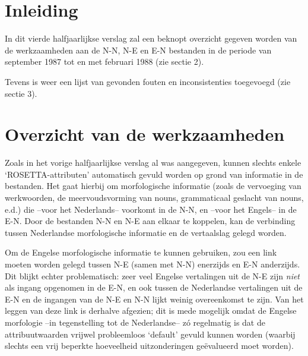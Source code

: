 
   \RosSupersedes{-}
   \MakeRosTitle
%
%

\section{Inleiding}

In dit vierde halfjaarlijkse verslag zal een beknopt 
overzicht gegeven worden van de 
werkzaamheden aan de N-N, N-E en E-N bestanden in de periode van september 1987
tot en met februari 1988 (zie sectie 2).

Tevens is weer een lijst van gevonden fouten en inconsistenties toegevoegd
(zie sectie 3).

\section{Overzicht van de werkzaamheden}

Zoals in het vorige halfjaarlijkse verslag al was aangegeven, kunnen slechts 
enkele `ROSETTA-attributen' automatisch gevuld worden op grond van informatie 
in de bestanden. Het gaat hierbij om morfologische informatie (zoals de 
vervoeging van werkwoorden, de meervoudsvorming van nouns, grammaticaal 
geslacht van nouns, e.d.) die --voor het Nederlands-- voorkomt in de N-N, en 
--voor het Engels-- in de E-N. 
Door de bestanden N-N en N-E aan elkaar te koppelen, kan de verbinding tussen
Nederlandse morfologische informatie en de vertaalslag gelegd worden.

Om de Engelse morfologische informatie te kunnen gebruiken, zou een link
moeten worden gelegd tussen N-E (samen met N-N) enerzijds en E-N anderzijds. Dit
blijkt echter problematisch: zeer veel Engelse vertalingen uit de N-E
zijn {\em niet} als ingang opgenomen in de E-N, en ook tussen de Nederlandse 
vertalingen uit de E-N en de ingangen van de N-E en N-N lijkt weinig 
overeenkomst te zijn. Van het leggen van deze link is derhalve afgezien; dit is
mede mogelijk omdat de Engelse morfologie --in tegenstelling tot de 
Nederlandse--
z\'{o} regelmatig is dat de 
attribuutwaarden vrijwel probleemloos `default' gevuld kunnen worden (waarbij
slechts een vrij beperkte hoeveelheid uitzonderingen ge\"{e}valueerd moet 
worden).


